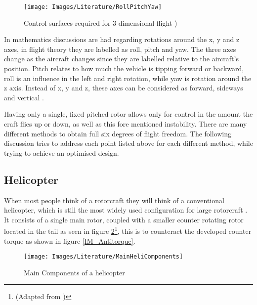 \begin{figure}[H]
	\centering
	\texttt{[image: Images/Literature/RollPitchYaw]}     
	\caption{Control surfaces required for 3 dimensional flight \cite{Heli})}
	\label{IM_PRY}
\end{figure}

In mathematics discussions are had regarding rotations around the x, y and z axes, in flight theory they are labelled as roll, pitch and yaw. The three axes change as the aircraft changes since they are labelled relative to the aircraft's position. Pitch relates to how much the vehicle is tipping forward or backward, roll is an influence in the left and right rotation, while yaw is rotation around the z axis. Instead of  x, y and z, these axes can be considered as forward, sideways and vertical \cite{Leishman}.

Having only a single, fixed pitched rotor allows only for control in the amount the craft flies up or down, as well as this fore mentioned instability. There are many different methods to obtain full six degrees of flight freedom. The following discussion tries to address each point listed above for each different method, while trying to achieve an optimised design.


\subsection{Helicopter}
When most people think of a rotorcraft they will think of a conventional helicopter, which is still the most widely used configuration for large rotorcraft \cite{RotorConfig}. It consists of a single main rotor, coupled with a smaller counter rotating rotor located in the tail as seen in figure \ref{IM_Helicopter}\footnote{(Adapted from \cite{Heli})}, this is to counteract the developed counter torque as shown in figure \ref{IM_Antitorque}.

\begin{figure}[H]
\centering
\texttt{[image: Images/Literature/MainHeliComponents]}     
\caption{Main Components of a helicopter \cite{Heli}}
\label{IM_Helicopter}
\end{figure}

